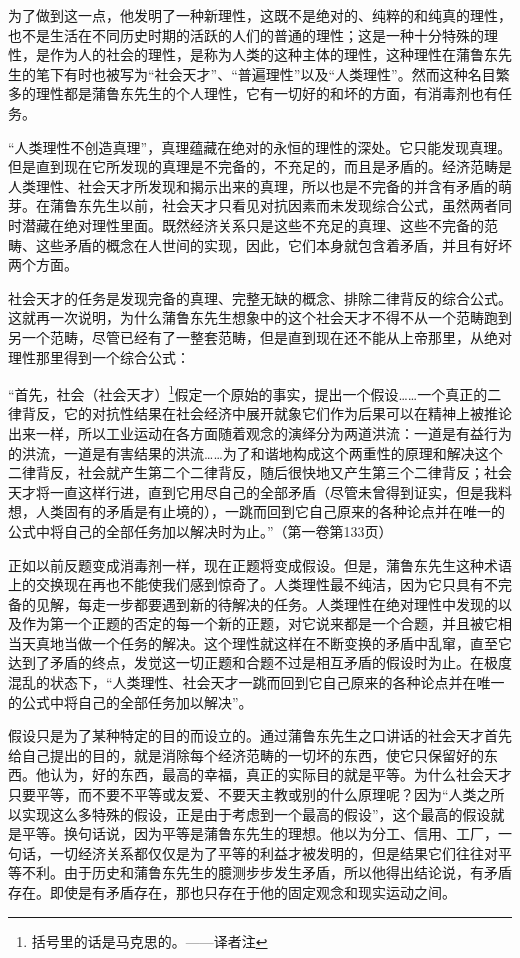 \documentclass[a4paper,twoside,12pt]{ctexart}
\begin{document}
为了做到这一点，他发明了一种新理性，这既不是绝对的、纯粹的和纯真的理性，也不是生活在不同历史时期的活跃的人们的普通的理性；这是一种十分特殊的理性，是作为人的社会的理性，是称为人类的这种主体的理性，这种理性在蒲鲁东先生的笔下有时也被写为“社会天才”、“普遍理性”以及“人类理性”。然而这种名目繁多的理性都是蒲鲁东先生的个人理性，它有一切好的和坏的方面，有消毒剂也有任务。

“人类理性不创造真理”，真理蕴藏在绝对的永恒的理性的深处。它只能发现真理。但是直到现在它所发现的真理是不完备的，不充足的，而且是矛盾的。经济范畴是人类理性、社会天才所发现和揭示出来的真理，所以也是不完备的并含有矛盾的萌芽。在蒲鲁东先生以前，社会天才只看见对抗因素而未发现综合公式，虽然两者同时潜藏在绝对理性里面。既然经济关系只是这些不充足的真理、这些不完备的范畴、这些矛盾的概念在人世间的实现，因此，它们本身就包含着矛盾，并且有好坏两个方面。

社会天才的任务是发现完备的真理、完整无缺的概念、排除二律背反的综合公式。这就再一次说明，为什么蒲鲁东先生想象中的这个社会天才不得不从一个范畴跑到另一个范畴，尽管已经有了一整套范畴，但是直到现在还不能从上帝那里，从绝对理性那里得到一个综合公式：

\begin{fangsong}
    “首先，社会（社会天才）\footnote{括号里的话是马克思的。——译者注}假定一个原始的事实，提出一个假设……一个真正的二律背反，它的对抗性结果在社会经济中展开就象它们作为后果可以在精神上被推论出来一样，所以工业运动在各方面随着观念的演绎分为两道洪流：一道是有益行为的洪流，一道是有害结果的洪流……为了和谐地构成这个两重性的原理和解决这个二律背反，社会就产生第二个二律背反，随后很快地又产生第三个二律背反；社会天才将一直这样行进，直到它用尽自己的全部矛盾（尽管未曾得到证实，但是我料想，人类固有的矛盾是有止境的），一跳而回到它自己原来的各种论点并在唯一的公式中将自己的全部任务加以解决时为止。”（第一卷第133页）
\end{fangsong}

正如以前反题变成消毒剂一样，现在正题将变成假设。但是，蒲鲁东先生这种术语上的交换现在再也不能使我们感到惊奇了。人类理性最不纯洁，因为它只具有不完备的见解，每走一步都要遇到新的待解决的任务。人类理性在绝对理性中发现的以及作为第一个正题的否定的每一个新的正题，对它说来都是一个合题，并且被它相当天真地当做一个任务的解决。这个理性就这样在不断变换的矛盾中乱窜，直至它达到了矛盾的终点，发觉这一切正题和合题不过是相互矛盾的假设时为止。在极度混乱的状态下，“人类理性、社会天才一跳而回到它自己原来的各种论点并在唯一的公式中将自己的全部任务加以解决”。

假设只是为了某种特定的目的而设立的。通过蒲鲁东先生之口讲话的社会天才首先给自己提出的目的，就是消除每个经济范畴的一切坏的东西，使它只保留好的东西。他认为，好的东西，最高的幸福，真正的实际目的就是平等。为什么社会天才只要平等，而不要不平等或友爱、不要天主教或别的什么原理呢？因为“人类之所以实现这么多特殊的假设，正是由于考虑到一个最高的假设”，这个最高的假设就是平等。换句话说，因为平等是蒲鲁东先生的理想。他以为分工、信用、工厂，一句话，一切经济关系都仅仅是为了平等的利益才被发明的，但是结果它们往往对平等不利。由于历史和蒲鲁东先生的臆测步步发生矛盾，所以他得出结论说，有矛盾存在。即使是有矛盾存在，那也只存在于他的固定观念和现实运动之间。
\end{document}
